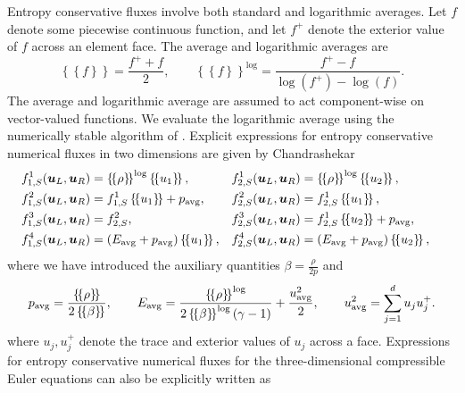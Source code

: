 \documentclass{svjour3}                     %
\newcommand{\LRp}[1]{\left( #1 \right)}
\newcommand{\LRc}[1]{\left\{ #1 \right\}}
\newcommand{\avg}[1] {\ensuremath{\LRc{\!\LRc{#1}\!}}}
\begin{document}
Entropy conservative fluxes involve both standard and logarithmic averages.  Let $f$ denote some piecewise continuous function, and let $f^+$ denote the exterior value of $f$ across an element face.  The average and logarithmic averages are
\[
{\avg{f} = \frac{f^+ + f}{2}}, \qquad {\avg{f}^{\log} = \frac{f^+ - f}{\log\LRp{f^+}-\log\LRp{f}}}.
\]
{The average and logarithmic average are assumed to act component-wise on vector-valued functions.  We evaluate the logarithmic average using the numerically stable algorithm of \cite{winters2019entropy}.}
Explicit expressions for entropy conservative numerical fluxes in two dimensions  are given by Chandrashekar \cite{chandrashekar2013kinetic}
\begin{align*}
&f^1_{1,S}(\bm{u}_L,\bm{u}_R) = \avg{\rho}^{\log} \avg{u_1},& &f^1_{2,S}(\bm{u}_L,\bm{u}_R) = \avg{\rho}^{\log} \avg{u_2},&\\
&f^2_{1,S}(\bm{u}_L,\bm{u}_R) = f^1_{1,S} \avg{u_1} + p_{\rm avg},&  &f^2_{2,S}(\bm{u}_L,\bm{u}_R) = f^1_{2,S} \avg{u_1},&\nonumber\\
&f^3_{1,S}(\bm{u}_L,\bm{u}_R) = f^2_{2,S},& &f^3_{2,S}(\bm{u}_L,\bm{u}_R) = f^1_{2,S} \avg{u_2} + p_{\rm avg},&\nonumber\\
&f^4_{1,S}(\bm{u}_L,\bm{u}_R) = \LRp{E_{\rm avg} + p_{\rm avg}}\avg{u_1},& &f^4_{2,S}(\bm{u}_L,\bm{u}_R) = \LRp{E_{\rm avg} + p_{\rm avg} }\avg{u_2},& \nonumber
\end{align*}
where we have introduced the auxiliary quantities $\beta = \frac{\rho}{2p}$ and  
\begin{gather}
p_{\rm avg} = \frac{\avg{\rho}}{2\avg{\beta}}, \qquad E_{\rm avg} = \frac{\avg{\rho}^{\log}}{2\avg{\beta}^{\log}\LRp{\gamma -1}}   + \frac{{u_{\rm avg}^2}}{2}, \qquad 
{u^2_{\rm avg}} = \sum_{j=1}^d u_j u_j^+ \label{eq:fluxaux}.
\end{gather}
where $u_j, u_j^+$ denote the trace and exterior values of $u_j$ across a face.  
Expressions for entropy conservative numerical fluxes for the three-dimensional compressible Euler equations can also be explicitly written as
\end{document}
